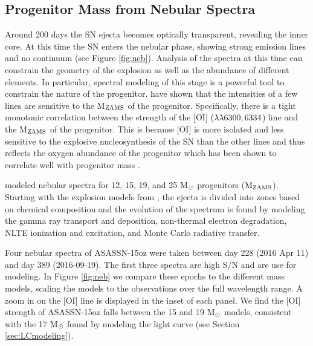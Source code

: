 \documentclass[a4paper,fleqn,usenatbib]{mnras}
\begin{document}
\subsection{Progenitor Mass from Nebular Spectra} \label{sec:nebular}
Around 200 days the SN ejecta becomes optically transparent, revealing the inner core. 
At this time the SN enters the nebular phase, showing strong emission lines and no continuum (see Figure \ref{fig:neb}).
Analysis of the spectra at this time can constrain the geometry of the explosion as well as the abundance of different elements.
In particular, spectral modeling of this stage is a powerful tool to constrain the nature of the progenitor.
\citet{2012jerkstrand,2014jerkstrand} have shown that the intensities of a few lines are sensitive to the M$\rm{_{ZAMS}}$ of the progenitor.
Specifically, there is a tight monotonic correlation between the strength of the [OI] ($\rm{\lambda\lambda6300, 6334}$) line and the M$\rm{_{ZAMS}}$ of the progenitor.
This is because [OI] is more isolated and less sensitive to the explosive nucleosynthesis of the SN than the other lines and thus reflects the oxygen abundance of the progenitor which has been shown to correlate well with progenitor mass \citep{1995woosley}.

\citet{2014jerkstrand} modeled nebular spectra for 12, 15, 19, and 25 M$\rm{_{\odot}}$ progenitors ($\rm{M_{ZAMS}}$).
Starting with the explosion models from \citet{2007woosley}, the ejecta is divided into zones based on chemical composition and the evolution of the spectrum is found by modeling the gamma ray transport and deposition, non-thermal electron degradation, NLTE ionization and excitation, and Monte Carlo radiative transfer.

Four nebular spectra of ASASSN-15oz were taken between day 228 (2016 Apr 11) and  day 389 (2016-09-19).
The first three spectra are high S/N and are use for modeling.
In Figure \ref{fig:neb} we compare these epochs to the different mass models, scaling the models to the observations over the full wavelength range. 
A zoom in on the [OI] line is displayed in the inset of each panel. 
We find the [OI] strength of ASASSN-15oz falls between the 15 and 19 M$\rm{_\odot}$ models, consistent with the 17 M$\rm{_{\odot}}$ found by modeling the light curve (see Section \ref{sec:LCmodeling}).
\end{document}
